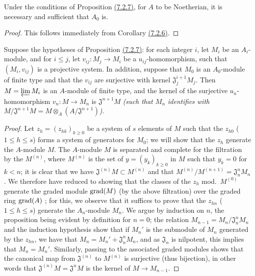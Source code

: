 \begin{cor}[7.2.8]
\label{0.7.2.8}
Under the conditions of Proposition \hyperref[0.7.2.7]{(7.2.7)}, for $A$ to
be Noetherian, it is necessary and sufficient that $A_0$ is.
\end{cor}

\begin{proof}
\label{proof-0.7.2.8}
This follows immediately from Corollary \hyperref[0.7.2.6]{(7.2.6)}.
\end{proof}

\begin{prop}[7.2.9]
\label{0.7.2.9}
Suppose the hypotheses of Proposition \hyperref[0.7.2.7]{(7.2.7)}: for each integer $i$,
let $M_i$ be an $A_i$-module, and for $i\leqslant j$, let $v_{ij}:M_j\to M_i$ be a
$u_{ij}$-homomorphism, such that $(M_i,v_{ij})$ is a projective system. In addition, suppose
that $M_0$ is an $A_0$-module of finite type and that the $v_{ij}$ are surjective with kernel
$\mathfrak{J}_j^{i+1}M_j$. Then $M=\varprojlim M_i$ is an $A$-module of finite type, and the
kernel of the surjective $u_n$-homomorphism $v_n:M\to M_n$ is $\mathfrak{J}^{n+1}M$
{\em (such that $M_n$ identifies with
$M/\mathfrak{J}^{n+1}M=M\otimes_A(A/\mathfrak{J}^{n+1})$)}.
\end{prop}

\begin{proof}
\label{proof-0.7.2.9}
Let $z_h=(z_{hk})_{k\geqslant 0}$ be a system of $s$ elements of $M$ such that the $z_{h0}$
($1\leqslant h\leqslant s$) forms a system of generators for $M_0$; we will show that the
$z_h$ generate the $A$-module $M$. The $A$-module $M$ is separated and complete for the
filtration by the $M^{(n)}$, where $M^{(n)}$ is the set of $y=(y_k)_{k\geqslant 0}$ in $M$
such that $y_k=0$ for $k<n$; it is clear that we have $\mathfrak{J}^{(n)}M\subset M^{(n)}$
and that $M^{(n)}/M^{(n+1)}=\mathfrak{J}_n^n M_n$. We therefore have reduced to showing that
the classes of the $z_h$ mod.~$M^{(0)}$ generate the graded module ${\mathop{\mathrm{grad}}\nolimits}(M)$ (by the
above filtration) over the graded ring ${\mathop{\mathrm{grad}}\nolimits}(A)$ \cite[p.~18--06, lemme]{I-1}; for this, we
observe that it suffices to prove that the $z_{hn}$ ($1\leqslant h\leqslant s$) generate the
$A_n$-module $M_n$. We argue by induction on $n$, the proposition being evident by definition
for $n=0$; the relation $M_{n-1}=M_n/\mathfrak{J}_n^n M_n$ and the induction hypothesis show
that if $M_n'$ is the submodule of $M_n$ generated by the $z_{hn}$, we have that
$M_n=M_n'+\mathfrak{J}_n^n M_n$, and as $\mathfrak{J}_n$ is nilpotent, this implies that
$M_n=M_n'$. Similarly, passing to the associated graded modules shows that the canonical map
from $\mathfrak{J}^{(n)}$ to $M^{(n)}$ is surjective (thus bijection), in other words that
$\mathfrak{J}^{(n)}M=\mathfrak{J}^n M$ is the kernel of $M\to M_{n-1}$.
\end{proof}


